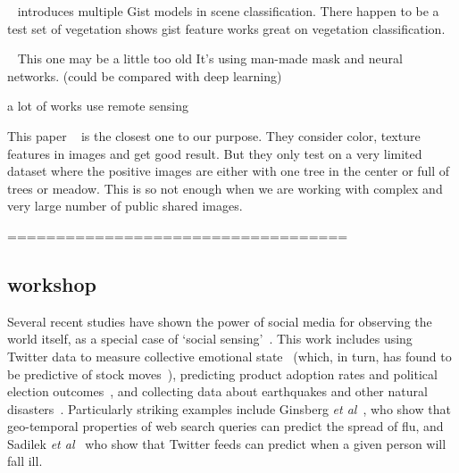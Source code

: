 ~\cite{Comparisons of Gist Models in Rapid Scene categorization tasks}
introduces multiple Gist models in scene classification. There happen to be a test set of vegetation shows gist feature works great on vegetation classification.

~\cite{Detecting subpixel woody vegetation in digital imagery using two artificial intelligence approaches}
This one may be a little too old
It's using man-made mask and neural networks.
(could be compared with deep learning)

a lot of works use remote sensing 

This paper ~\cite{greenery and non-greenery image classification using adaptive neuro-guzzy inference system}
is the closest one to our purpose.
They consider
color, texture features in images and get good result. But they only test on a very limited dataset where the positive images are either with one tree in the center or full of trees or meadow. This is so not enough when we are working with  complex and very large number of public shared images.


\hfill \break
\hfill \break
===================================
\hfill \break
\hfill \break
\subsection*{workshop}



\vspace{-8pt}
 Several recent studies have
shown the power of social media  for observing
the world itself, as a special case of
`social sensing'~\cite{Aggarwal:2013vh}.
This
work includes using Twitter data to measure collective emotional
state~\cite{Golder:2011cy} (which, in turn, has found to
be predictive of stock  moves~\cite{bollen11twitter}),
predicting product adoption rates and political election
outcomes~\cite{jin10prediction}, and collecting data about
earthquakes and other natural disasters~\cite{Sakaki:2010uv}.
Particularly striking examples include Ginsberg
\textit{et al}~\cite{ginsberg09flu}, who show that 
geo-temporal properties of web search queries can
predict the spread of flu, and 
Sadilek \textit{et al}~\cite{Sadilek:2012wp} who show that
Twitter feeds can predict when a given person will
fall ill.

